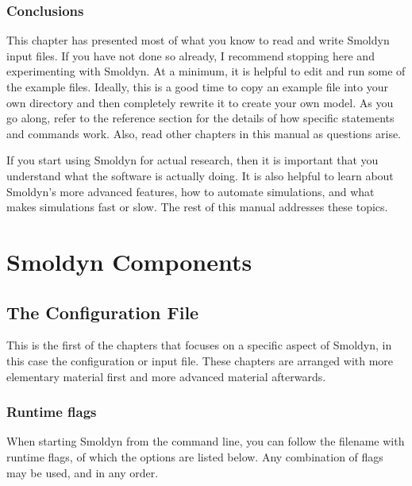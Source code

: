 \documentclass {scrbook}
\begin{document}
\section{Conclusions}

This chapter has presented most of what you know to read and write Smoldyn input files. If you have not done so already, I recommend stopping here and experimenting with Smoldyn. At a minimum, it is helpful to edit and run some of the example files. Ideally, this is a good time to copy an example file into your own directory and then completely rewrite it to create your own model. As you go along, refer to the reference section for the details of how specific statements and commands work. Also, read other chapters in this manual as questions arise.

If you start using Smoldyn for actual research, then it is important that you understand what the software is actually doing. It is also helpful to learn about Smoldyn's more advanced features, how to automate simulations, and what makes simulations fast or slow. The rest of this manual addresses these topics.

\part{Smoldyn Components}

\chapter{The Configuration File}

This is the first of the chapters that focuses on a specific aspect of Smoldyn, in this case the configuration or input file. These chapters are arranged with more elementary material first and more advanced material afterwards.

\section{Runtime flags}

When starting Smoldyn from the command line, you can follow the filename with runtime flags, of which the options are listed below. Any combination of flags may be used, and in any order.
\end{document}
